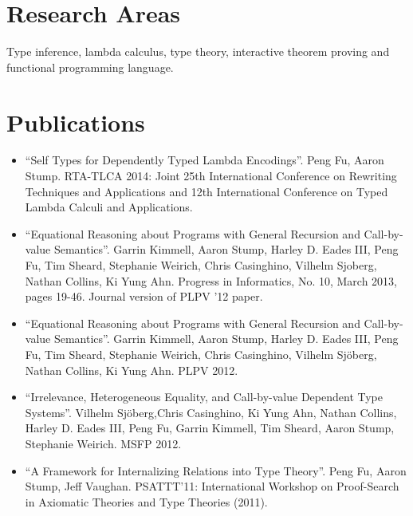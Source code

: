 \documentclass[11pt]{article}
\begin{document}
\section*{Research Areas}
Type inference, lambda calculus, type theory, interactive theorem proving and functional programming language.
\section*{Publications}

\begin{itemize}
  \item ``Self Types for Dependently Typed Lambda Encodings''. Peng Fu, Aaron Stump. RTA-TLCA 2014: Joint 25th International Conference on Rewriting Techniques and Applications and 12th International Conference on Typed Lambda Calculi and Applications. 
  \item ``Equational Reasoning about Programs with General Recursion and Call-by-value Semantics''. Garrin Kimmell, Aaron Stump, Harley D. Eades III, Peng Fu, Tim Sheard, Stephanie Weirich, Chris Casinghino, Vilhelm Sjoberg, Nathan Collins, Ki Yung Ahn. Progress in Informatics, No. 10, March 2013, pages 19-46. Journal version of PLPV '12 paper. 
\item ``Equational Reasoning about Programs with General Recursion and Call-by-value Semantics''. Garrin Kimmell, Aaron Stump, Harley D. Eades III, Peng Fu, Tim Sheard, Stephanie Weirich, Chris Casinghino, Vilhelm Sj\"oberg, Nathan Collins, Ki Yung Ahn. PLPV 2012. 
\item ``Irrelevance, Heterogeneous Equality, and Call-by-value Dependent Type Systems''. Vilhelm Sj\"oberg,Chris Casinghino, Ki Yung Ahn, Nathan Collins, Harley D. Eades III, Peng Fu, Garrin Kimmell, Tim Sheard, Aaron Stump, Stephanie Weirich. MSFP 2012.
\item ``A Framework for Internalizing Relations into Type Theory''. Peng Fu, Aaron Stump, Jeff Vaughan. PSATTT'11: International Workshop on Proof-Search in Axiomatic Theories and Type Theories (2011).
\end{itemize}
\end{document}
